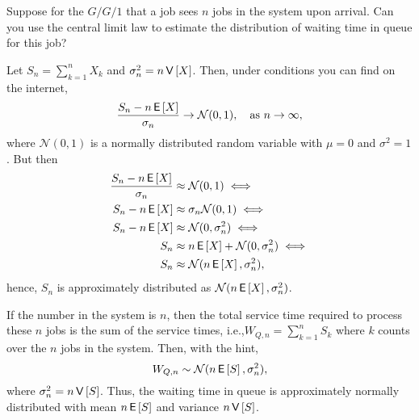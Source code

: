 \begin{exercise}
  Suppose for the $G/G/1$ that a job sees $n$ jobs in the system upon
  arrival. Can you use the central limit law to estimate the
  distribution of waiting time in queue for this job?  
  \begin{hint}
 Let $S_n = \sum_{k=1}^n X_k$ and $\sigma_n^2 = n\,\mathsf{V}\left[X\right]$. Then,
    under conditions you can find on the internet,
    \begin{equation*}
    \frac{S_n - n \,\mathsf{E}\left[X\right]}{\sigma_n} \to \mathcal{N}(0,1), \quad\text{as } n\to \infty,
    \end{equation*}
    where $\mathcal{N}(0,1)$ is a normally distributed random variable
    with $\mu=0$ and $\sigma^2=1$. But then 
    \begin{align*}
    \frac{S_n - n \,\mathsf{E}\left[X\right]}{\sigma_n} &\approx  \mathcal{N}(0,1)  \iff\\
    S_n - n \,\mathsf{E}\left[X\right] &\approx  \sigma_n \mathcal{N}(0,1)  \iff\\
    S_n - n \,\mathsf{E}\left[X\right] &\approx  \mathcal{N}(0,\sigma_n^2)  \iff\\
    S_n  &\approx   n \,\mathsf{E}\left[X\right] + \mathcal{N}(0,\sigma_n^2)  \iff\\
    S_n  &\approx    \mathcal{N}(n \,\mathsf{E}\left[X\right],\sigma_n^2),
    \end{align*}
    hence, $S_n$ is approximately distributed as
    $\mathcal{N}(n\,\mathsf{E}\left[X\right], \sigma_n^2)$.
  \end{hint}
\begin{solution} If the number in the system is $n$, then the total
  service time required to process these $n$ jobs is the sum of the
  service times, i.e.,$W_{Q,n} = \sum_{k=1}^n S_k$ where $k$ counts over the
  $n$ jobs in the system. Then, with the hint,
  \begin{equation*}
    W_{Q, n} \sim  \mathcal{N}(n\,\mathsf{E}\left[S\right], \sigma_n^2),
  \end{equation*}
where $\sigma_n^2 = n \,\mathsf{V}\left[S\right]$. 
Thus, the waiting time in queue is approximately normally distributed with mean $n \,\mathsf{E}\left[S\right]$ and variance $n \,\mathsf{V}\left[S\right]$. 
\end{solution}
\end{exercise}

